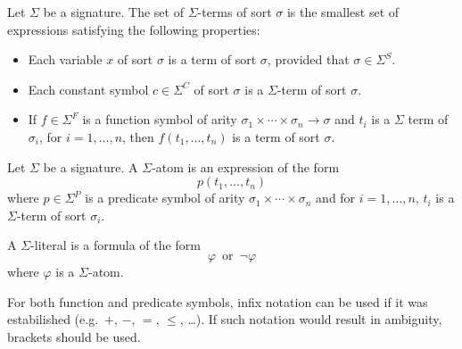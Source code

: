 \begin{definition}
    Let $\Sigma$ be a signature. The set of $\Sigma$-terms of sort $\sigma$
    is the smallest set of expressions satisfying the following properties:
    \begin{itemize}
        \item Each variable $x$ of sort $\sigma$ is a term of sort $\sigma$, provided that $\sigma\in \Sigma^S$.
        \item Each constant symbol $c\in \Sigma^C$ of sort $\sigma$ is a $\Sigma$-term of sort $\sigma$.
        \item If $f\in \Sigma^F$ is a function symbol of arity $\sigma_1\times\cdots\times \sigma_n\to \sigma$
            and $t_i$ is a $\Sigma$ term of $\sigma_i$, for $i=1,\ldots, n$, then $f(t_1,\ldots,t_n)$ is a term of sort $\sigma$.
    \end{itemize}
\end{definition}

\begin{definition}
    Let $\Sigma$ be a signature.
    A $\Sigma$-atom is an expression of the form
    \begin{equation*}
        p(t_1, \ldots, t_n)
    \end{equation*}
    where $p\in \Sigma^P$ is a predicate symbol of arity $\sigma_1\times\cdots\times\sigma_n$
    and for $i=1,\ldots,n$, $t_i$ is a $\Sigma$-term of sort $\sigma_i$.

    A $\Sigma$-literal is a formula of the form
    \begin{equation*}
        \varphi\, \text{ or } \,\neg\varphi
    \end{equation*}
    where $\varphi$ is a $\Sigma$-atom.
\end{definition}

For both function and predicate symbols, infix notation can be used if it was estabilished
(e.g.\ $+$, $-$, $=$, $\leq$, \ldots). If such notation would result in ambiguity, brackets should be used.

